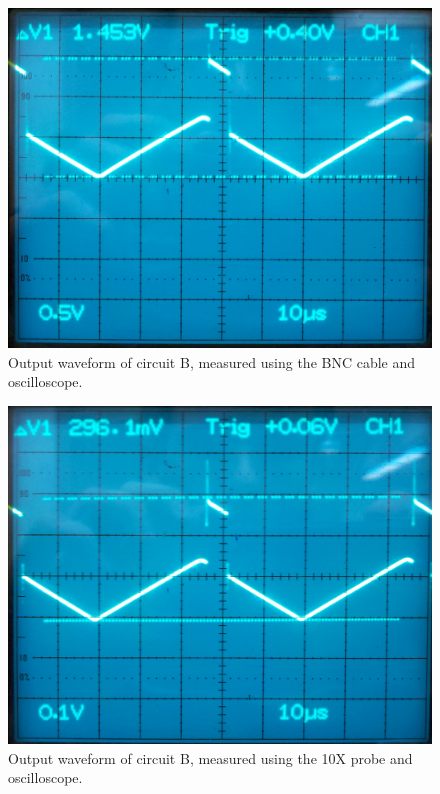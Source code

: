 \documentclass[12pt,letterpaper]{report}
\newlength \figwidth
\begin{document}
\begin{figure}
\centering
\includegraphics[width=\figwidth, keepaspectratio=true]{lab2/lab2_images/BNC_CircuitB.png}
\caption{Output waveform of circuit B, measured using the BNC cable and oscilloscope.}
\label{fig:bnc_circuit_B}
\end{figure}

\begin{figure}
\centering
\includegraphics[width=\figwidth, keepaspectratio=true]{lab2/lab2_images/10x_CircuitB.png}
\caption{Output waveform of circuit B, measured using the 10X probe and oscilloscope.}
\label{fig:10x_circuit_B}
\end{figure}
\end{document}
